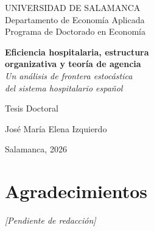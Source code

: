 \documentclass[12pt, a4paper, twoside, openright]{book}
\theoremstyle{plain}
\theoremstyle{definition}
\theoremstyle{remark}
\begin{document}

\begin{titlepage}
\centering
\vspace*{2cm}

{\large UNIVERSIDAD DE SALAMANCA}\\[0.3cm]
{\normalsize Departamento de Economía Aplicada}\\[0.3cm]
{\normalsize Programa de Doctorado en Economía}

\vspace{2.5cm}

{\LARGE\bfseries Eficiencia hospitalaria, estructura\\[0.3cm]
organizativa y teoría de agencia}\\[0.6cm]
{\Large\itshape Un análisis de frontera estocástica\\
del sistema hospitalario español}

\vspace{2.5cm}

{\large Tesis Doctoral}

\vspace{1.5cm}

{\large José María Elena Izquierdo}

\vfill

{\normalsize Salamanca, 2026}
\end{titlepage}

\frontmatter

\chapter*{Agradecimientos}
\vspace{2cm}
\begin{center}
\textit{[Pendiente de redacción]}
\end{center}

\tableofcontents
\listoftables
\listoffigures

\mainmatter



\end{document}
